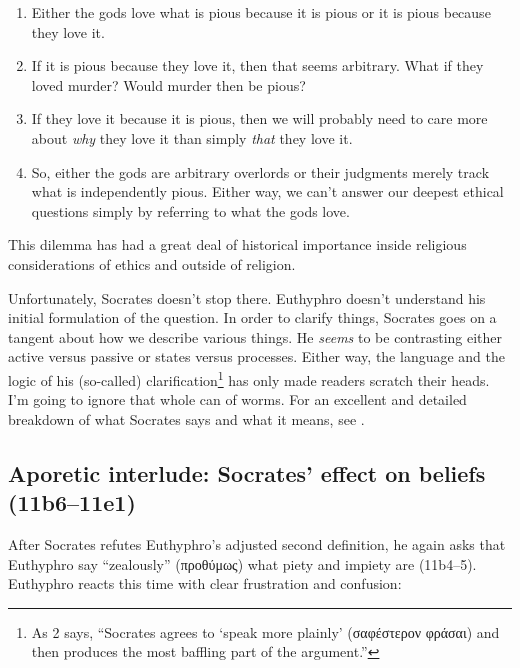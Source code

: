 \documentclass[11pt]{article}
\begin{document}
\begin{enumerate}

    \item Either the gods love what is pious because it is pious or it is
        pious because they love it.

    \item If it is pious because they love it, then that seems arbitrary.
        What if they loved murder?  Would murder then be pious?

    \item If they love it because it is pious, then we will probably need
        to care more about \emph{why} they love it than simply \emph{that}
        they love it.

    \item So, either the gods are arbitrary overlords or their judgments
        merely track what is independently pious.  Either way, we can't
        answer our deepest ethical questions simply by referring to what
        the gods love.

\end{enumerate}

This dilemma has had a great deal of historical importance inside religious
considerations of ethics and outside of religion.

Unfortunately, Socrates doesn't stop there.  Euthyphro doesn't understand
his initial formulation of the question.  In order to clarify things,
Socrates goes on a tangent about how we describe various things.  He
\emph{seems} to be contrasting either active versus passive or states
versus processes.  Either way, the language and the logic of his
(so-called) clarification\footnote{As \cite{cohen1971} 2 says, ``Socrates
agrees to `speak more plainly' ({\g σαφέστερον φράσαι}) and then produces
the most baffling part of the argument.''} has only made readers scratch
their heads.  I'm going to ignore that whole can of worms.  For an excellent
and detailed breakdown of what Socrates says and what it means, see
\citet{cohen1971}.


\subsection{Aporetic interlude: Socrates' effect on beliefs (11b6--11e1)}

After Socrates refutes Euthyphro's adjusted second definition, he again
asks that Euthyphro say ``zealously'' ({\g προθύμως}) what piety and impiety
are (11b4--5).  Euthyphro reacts this time with clear frustration and
confusion:
\end{document}
